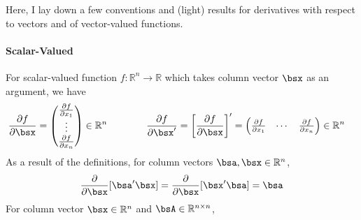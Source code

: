 \documentclass[12pt]{article}
\theoremstyle{plain}
\theoremstyle{definition}
\theoremstyle{remark}
\newcommand{\Rn}{\mathbb{R}^n}
\newcommand{\Rnn}{\mathbb{R}^{n\times n}}
\begin{document}
Here, I lay down a few conventions and (light) results for derivatives
with respect to vectors and of vector-valued functions.

\paragraph{Scalar-Valued}
For scalar-valued function $f: \mathbb{R}^n \rightarrow \mathbb{R}$
which takes column vector $\bsx$ as an argument, we have
\begin{align*}
  \frac{\partial f}{\partial \bsx}
  &=
  \begin{pmatrix}
    \frac{\partial f}{\partial x_1} \\
    \vdots\\
    \frac{\partial f}{\partial x_n} \\
    \end{pmatrix} \in \mathbb{R}^n
  \qquad
  \qquad
  \frac{\partial f}{\partial \bsx'}
  =
  \left[
  \frac{\partial f}{\partial \bsx}
  \right]'
  =
  \begin{pmatrix}
    \frac{\partial f}{\partial x_1} &
    \cdots&
    \frac{\partial f}{\partial x_n}
  \end{pmatrix}\in \mathbb{R}^n
\end{align*}
As a result of the definitions, for column vectors $\bsa,\bsx\in \Rn$,
\begin{align*}
  \frac{\partial}{\partial \bsx}
  [\bsa'\bsx]
  =
  \frac{\partial}{\partial \bsx}
  [\bsx'\bsa]
  = \bsa
\end{align*}
For column vector $\bsx\in \Rn$ and $\bsA\in\Rnn$,
\end{document}
